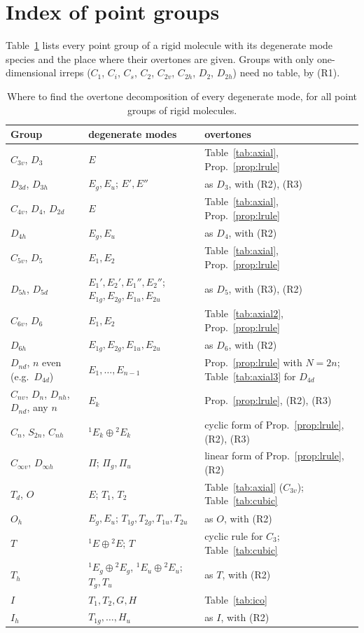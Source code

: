 \documentclass[11pt]{article}
\begin{document}
\section{Index of point groups}

Table~\ref{tab:index} lists every point group of a rigid molecule with its degenerate mode species and the place where their overtones are given. Groups with only one-dimensional irreps ($C_1$, $C_i$, $C_s$, $C_2$, $C_{2v}$, $C_{2h}$, $D_2$, $D_{2h}$) need no table, by (R1).

\begin{table}[H]
\centering\small
\begin{tabular}{lll}
\hline
Group & degenerate modes & overtones\\
\hline
$C_{3v}$, $D_3$ & $E$ & Table~\ref{tab:axial}, Prop.~\ref{prop:lrule}\\
$D_{3d}$, $D_{3h}$ & $E_g,E_u$; $E',E''$ & as $D_3$, with (R2), (R3)\\
$C_{4v}$, $D_4$, $D_{2d}$ & $E$ & Table~\ref{tab:axial}, Prop.~\ref{prop:lrule}\\
$D_{4h}$ & $E_g,E_u$ & as $D_4$, with (R2)\\
$C_{5v}$, $D_5$ & $E_1,E_2$ & Table~\ref{tab:axial}, Prop.~\ref{prop:lrule}\\
$D_{5h}$, $D_{5d}$ & $E_1',E_2',E_1'',E_2''$; $E_{1g},E_{2g},E_{1u},E_{2u}$ & as $D_5$, with (R3), (R2)\\
$C_{6v}$, $D_6$ & $E_1,E_2$ & Table~\ref{tab:axial2}, Prop.~\ref{prop:lrule}\\
$D_{6h}$ & $E_{1g},E_{2g},E_{1u},E_{2u}$ & as $D_6$, with (R2)\\
$D_{nd}$, $n$ even (e.g.\ $D_{4d}$) & $E_1,\ldots,E_{n-1}$ & Prop.~\ref{prop:lrule} with $N=2n$; Table~\ref{tab:axial3} for $D_{4d}$\\
$C_{nv}$, $D_n$, $D_{nh}$, $D_{nd}$, any $n$ & $E_k$ & Prop.~\ref{prop:lrule}, (R2), (R3)\\
$C_n$, $S_{2n}$, $C_{nh}$ & ${}^1E_k\oplus{}^2E_k$ & cyclic form of Prop.~\ref{prop:lrule}, (R2), (R3)\\
$C_{\infty v}$, $D_{\infty h}$ & $\Pi$; $\Pi_g,\Pi_u$ & linear form of Prop.~\ref{prop:lrule}, (R2)\\
$T_d$, $O$ & $E$; $T_1$, $T_2$ & Table~\ref{tab:axial} ($C_{3v}$); Table~\ref{tab:cubic}\\
$O_h$ & $E_g,E_u$; $T_{1g},T_{2g},T_{1u},T_{2u}$ & as $O$, with (R2)\\
$T$ & ${}^1E\oplus{}^2E$; $T$ & cyclic rule for $C_3$; Table~\ref{tab:cubic}\\
$T_h$ & ${}^1E_g\oplus{}^2E_g$, ${}^1E_u\oplus{}^2E_u$; $T_g,T_u$ & as $T$, with (R2)\\
$I$ & $T_1,T_2,G,H$ & Table~\ref{tab:ico}\\
$I_h$ & $T_{1g},\ldots,H_u$ & as $I$, with (R2)\\
\hline
\end{tabular}
\caption{Where to find the overtone decomposition of every degenerate mode, for all point groups of rigid molecules.}
\label{tab:index}
\end{table}
\end{document}
